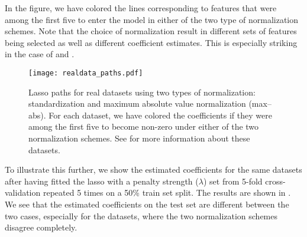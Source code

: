 In the figure, we have colored the lines corresponding to features that were among the
first five to enter the model in either of the two type of normalization schemes. Note that
the choice of normalization result in different sets of features being selected as well as
different coefficient estimates. This is especially striking in the case of
 and .

\begin{figure}[bpt]
  \centering
  \texttt{[image: realdata\_paths.pdf]}
  \caption{%
    Lasso paths for real datasets using two types of normalization:
    standardization and maximum absolute value normalization (max--abs). For
    each dataset, we have colored the coefficients if they were among the first
    five to become non-zero under either of the two normalization schemes. See
     for more information about these datasets.
  }
  \label{fig:realdata-paths}
\end{figure}

To illustrate this further, we show the estimated coefficients for the same datasets after
having fitted the lasso with a penalty strength (\(\lambda\)) set from 5-fold
cross-validation repeated 5 times on a 50\% train set split. The results are shown in
. We see that the estimated coefficients on the test set are
different between the two cases, especially for the  datasets, where the
two normalization schemes disagree completely.

